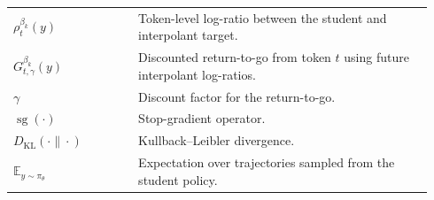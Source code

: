 \begin{table}[hbt]
\begin{tabular}{p{0.28\linewidth}p{0.66\linewidth}}
\midrule

$\rho_t^{\beta_k}(y)$ & Token-level log-ratio between the student and interpolant target. \\
$G_{t,\gamma}^{\beta_k}(y)$ & Discounted return-to-go from token $t$ using future interpolant log-ratios. \\
$\gamma$ & Discount factor for the return-to-go. \\
$\operatorname{sg}(\cdot)$ & Stop-gradient operator. \\

\midrule

$D_{\mathrm{KL}}(\cdot\|\cdot)$ & Kullback--Leibler divergence. \\
$\mathbb{E}_{y\sim\pi_\theta}$ & Expectation over trajectories sampled from the student policy. \\

\bottomrule
\end{tabular}
\end{table}